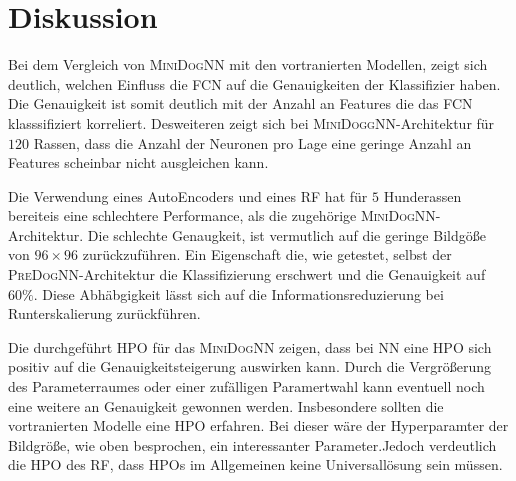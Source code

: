 \section{Diskussion}
Bei dem Vergleich von \textsc{MiniDogNN} mit den vortranierten Modellen,
zeigt sich deutlich, welchen Einfluss die FCN auf die Genauigkeiten der
Klassifizier haben. Die Genauigkeit ist somit deutlich mit der Anzahl an Features
die das FCN klasssifiziert korreliert. Desweiteren zeigt sich bei \textsc{MiniDoggNN}-Architektur
für $120$ Rassen, dass die Anzahl der Neuronen pro Lage eine geringe Anzahl an
Features scheinbar nicht ausgleichen kann.

Die Verwendung eines AutoEncoders und eines RF hat für $5$ Hunderassen bereiteis
eine schlechtere Performance, als die zugehörige \textsc{MiniDogNN}-Architektur.
Die schlechte Genaugkeit, ist vermutlich auf die geringe Bildgöße von $96\times96$
zurückzuführen. Ein Eigenschaft die, wie getestet, selbst der \textsc{PreDogNN}-Architektur
die Klassifizierung erschwert und die Genauigkeit auf $60\%$. Diese Abhäbgigkeit
lässt sich auf die Informationsreduzierung bei Runterskalierung zurückführen.

Die durchgeführt HPO für das \textsc{MiniDogNN} zeigen, dass bei NN eine HPO
sich positiv auf die Genauigkeitsteigerung auswirken kann. Durch die Vergrößerung
des Parameterraumes oder einer zufälligen Paramertwahl kann eventuell noch eine
weitere an Genauigkeit gewonnen werden. Insbesondere sollten die vortranierten
Modelle eine HPO erfahren. Bei dieser wäre der Hyperparamter der Bildgröße,
wie oben besprochen, ein interessanter Parameter.Jedoch verdeutlich
die HPO des RF, dass HPOs im Allgemeinen keine Universallösung sein müssen.

